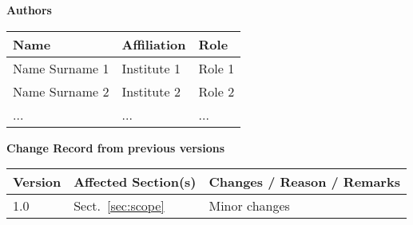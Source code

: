 \documentclass[12pt,a4paper]{article}
\begin{document}



\newpage
\pagestyle{fancy}

\noindent
{\Large \bf Authors}
\medskip

\noindent
\begin{tabularx}{\textwidth}{|l|X|X|}
  \hline
      {\bf Name} & {\bf Affiliation} & {\bf Role}\\
      \hline
      Name Surname 1     & Institute 1 & Role 1\\ \hline
      Name Surname 2     & Institute 2 & Role 2\\ \hline
      ...                & ...         & ...   \\ \hline
\end{tabularx}

\vspace{3cm}

\noindent
{\Large \bf Change Record from previous versions}
\medskip

\noindent
\begin{tabularx}{\textwidth}{|l|l|X|}
  \hline
      {\bf Version} & {\bf Affected Section(s)} & {\bf Changes / Reason / Remarks}\\  \hline
      1.0 & Sect.~\ref{sec:scope} &  Minor changes \\ \hline
\end{tabularx}


\newpage
\tableofcontents \thispagestyle{fancy}


\newpage





\newpage
\listofreq \thispagestyle{fancy}

\listofquestion \thispagestyle{fancy}


\label{LastPage}
\end{document}
